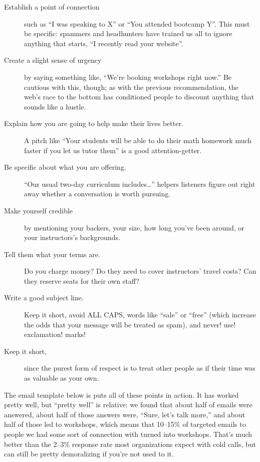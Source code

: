 \begin{description}

\item[Establish a point of connection] such as ``I was speaking to X''
  or ``You attended bootcamp Y''. This must be specific: spammers and
  headhunters have trained us all to ignore anything that starts, ``I
  recently read your website''.

\item[Create a slight sense of urgency] by saying something like,
  ``We're booking workshops right now.''  Be cautious with this,
  though; as with the previous recommendation, the web's race to the
  bottom has conditioned people to discount anything that sounds like
  a hustle.

\item[Explain how you are going to help make their lives better.]  A
  pitch like ``Your students will be able to do their math homework
  much faster if you let us tutor them'' is a good attention-getter.

\item[Be specific about what you are offering.] ``Our usual two-day
  curriculum includes{\ldots}'' helpers listeners figure out right
  away whether a conversation is worth pursuing.

\item[Make yourself credible] by mentioning your backers, your size,
  how long you've been around, or your instructors's backgrounds.

\item[Tell them what your terms are.]  Do you charge money? Do they
  need to cover instructors' travel costs?  Can they reserve seats for
  their own staff?

\item[Write a good subject line.]  Keep it short, avoid ALL CAPS,
  words like ``sale'' or ``free'' (which increase the odds that your
  message will be treated as spam), and never! use! exclamation!
  marks!

\item[Keep it short,] since the purest form of respect is to treat
  other people as if their time was as valuable as your own.

\end{description}

The email template below is puts all of these points in action.  It
has worked pretty well, but ``pretty well'' is relative: we found that
about half of emails were answered, about half of those answers were,
``Sure, let's talk more,'' and about half of those led to workshops,
which means that 10--15\% of targeted emails to people we had some
sort of connection with turned into workshops.  That's much better
than the 2--3\% response rate most organizations expect with cold
calls, but can still be pretty demoralizing if you're not used to it.

